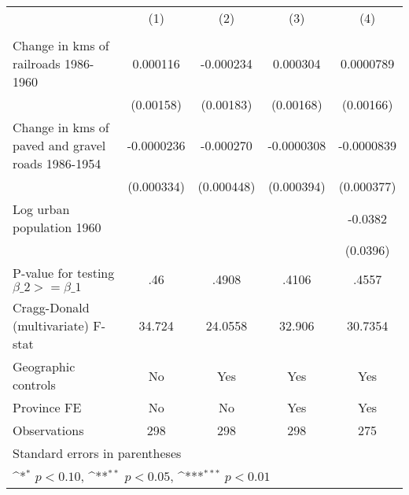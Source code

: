 {
\def\sym#1{\ifmmode^{#1}\else\(^{#1}\)\fi}
\begin{tabular}{l*{4}{c}}
\hline\hline
                &\multicolumn{1}{c}{(1)}&\multicolumn{1}{c}{(2)}&\multicolumn{1}{c}{(3)}&\multicolumn{1}{c}{(4)}\\
                &\multicolumn{1}{c}{}&\multicolumn{1}{c}{}&\multicolumn{1}{c}{}&\multicolumn{1}{c}{}\\
\hline
Change in kms of railroads 1986-1960& 0.000116         &-0.000234         & 0.000304         &0.0000789         \\
                &(0.00158)         &(0.00183)         &(0.00168)         &(0.00166)         \\
[1em]
Change in kms of paved and gravel roads 1986-1954&-0.0000236         &-0.000270         &-0.0000308         &-0.0000839         \\
                &(0.000334)         &(0.000448)         &(0.000394)         &(0.000377)         \\
[1em]
Log urban population 1960&                  &                  &                  &  -0.0382         \\
                &                  &                  &                  & (0.0396)         \\
\hline
P-value for testing $\beta\_{2} >= \beta\_{1}$&      .46         &    .4908         &    .4106         &    .4557         \\
Cragg-Donald (multivariate) F-stat&   34.724         &  24.0558         &   32.906         &  30.7354         \\
Geographic controls&       No         &      Yes         &      Yes         &      Yes         \\
Province FE     &       No         &       No         &      Yes         &      Yes         \\
Observations    &      298         &      298         &      298         &      275         \\
\hline\hline
\multicolumn{5}{l}{\footnotesize Standard errors in parentheses}\\
\multicolumn{5}{l}{\footnotesize \sym{*} \(p<0.10\), \sym{**} \(p<0.05\), \sym{***} \(p<0.01\)}\\
\end{tabular}
}
